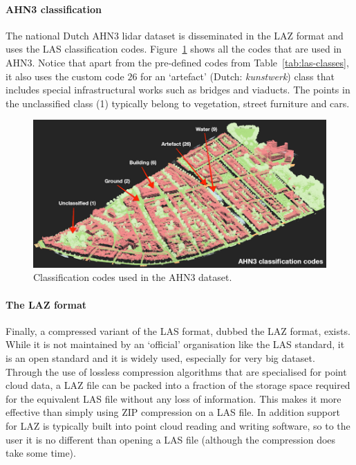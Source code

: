 \paragraph{AHN3 classification} The national Dutch AHN3 lidar dataset is disseminated in the LAZ format and uses the LAS classification codes. Figure~\ref{fig:ahn3} shows all the codes that are used in  AHN3. Notice that apart from the pre-defined codes from Table~\ref{tab:las-classes}, it also uses the custom code $26$ for an `artefact' (Dutch: \emph{kunstwerk}) class that includes special infrastructural works such as bridges and viaducts. The points in the unclassified class (1) typically belong to vegetation, street furniture and cars.
\begin{figure}
  \includegraphics[width=\linewidth]{figs/ahn3.png}
  \caption{Classification codes used in the AHN3 dataset.}
  \label{fig:ahn3}
\end{figure}



\paragraph{The LAZ format}
Finally, a compressed variant of the LAS format, dubbed the LAZ format, exists.
While it is not maintained by an `official' organisation like the LAS standard, it is an open standard and it is widely used, especially for very big dataset.
Through the use of lossless compression algorithms that are specialised for point cloud data, a LAZ file can be packed into a fraction of the storage space required for the equivalent LAS file without any loss of information.
This makes it more effective than simply using ZIP compression on a LAS file.
In addition support for LAZ is typically built into point cloud reading and writing software, so to the user it is no different than opening a LAS file (although the compression does take some time).

